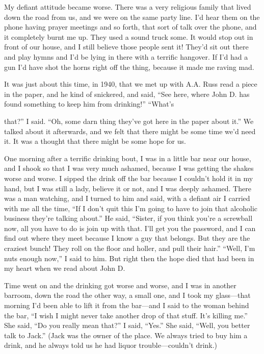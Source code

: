 My defiant attitude became worse. There was a very religious family that lived down the road from us, and we were on the same party line. I’d hear them on the phone having prayer meetings and so forth, that sort of talk over the phone, and it completely burnt me up. They used a sound truck some. It would stop out in front of our house, and I still believe those people sent it! They’d sit out there and play hymns and I’d be lying in there with a terrific hangover. If I’d had a gun I’d have shot the horns right off the thing, because it made me raving mad.

It was just about this time, in 1940, that we met up with A.A. Russ read a piece in the paper, and he kind of snickered, and said, “See here, where John D. has found something to keep him from drinking!” “What’s

that?” I said. “Oh, some darn thing they’ve got here in the paper about it.” We talked about it afterwards, and we felt that there might be some time we’d need it. It was a thought that there might be some hope for us.

One morning after a terrific drinking bout, I was in a little bar near our house, and I shook so that I was very much ashamed, because I was getting the shakes worse and worse. I sipped the drink off the bar because I couldn’t hold it in my hand, but I was still a lady, believe it or not, and I was deeply ashamed. There was a man watching, and I turned to him and said, with a defiant air I carried with me all the time, “If I don’t quit this I’m going to have to join that alcoholic business they’re talking about.” He said, “Sister, if you think you’re a screwball now, all you have to do is join up with that. I’ll get you the password, and I can find out where they meet because I know a guy that belongs. But they are the craziest bunch! They roll on the floor and holler, and pull their hair.” “Well, I’m nuts enough now,” I said to him. But right then the hope died that had been in my heart when we read about John D.

Time went on and the drinking got worse and worse, and I was in another barroom, down the road the other way, a small one, and I took my glass—that morning I’d been able to lift it from the bar—and I said to the woman behind the bar, “I wish I might never take another drop of that stuff. It’s killing me.” She said, “Do you really mean that?” I said, “Yes.” She said, “Well, you better talk to Jack.” (Jack was the owner of the place. We always tried to buy him a drink, and he always told us he had liquor trouble—couldn’t drink.)

